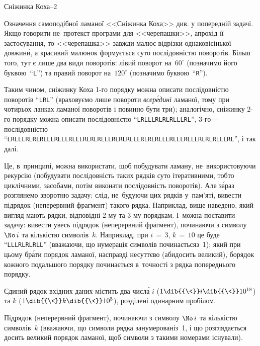 \begin{problemAllDefault}{Сніжинка Коха--2}

Означення самоподібної ламаної <<Сніжинка Коха>> див. у попередній задачі.
Якщо говорити не~про\nolinebreak[2] текст програми для <<черепашки>>, а\nolinebreak[3] про\nolinebreak[2] хід її застосування, то 
<<черепашка>> завжди малює відрізки однаковісінької довжин\'{и}, а красивий малюнок формується суто послідовністю поворотів. Більш того, тут є лише два види поворотів:  
лівий поворот на~$60^\circ$ (позначимо його буквою~``\texttt{L}'') та
правий поворот на~$120^\circ$ (позначимо буквою~``\texttt{R}'').

{%
Таким чином, сніжинку Коха \mbox{1-го} порядку можна описати послідовністю поворотів 
``\texttt{\small{LRL}}'' (враховуємо лише повороти \emph{всер\'{е}дині} ламаної, тому при чотирьох ланках ламаної поворотів і повинно бути три); аналогічно, сніжинку \mbox{2-го} порядку можна описати послідовністю  
``\texttt{\small{LRLLLRLRLRLLLRL}}'', \mbox{3-го}\nolinebreak[3] --- послідовністю 
``\texttt{\small{LRLLLRLRLRLLLRLLLRLLLRLRLRLLLRLRLRLLLRLRLRLLLRLLLRLLLRLRLRLLLRL}}'', і так далі.

}

Це, в~принципі, можна використати, щоб побудувати ламану, не~використовуючи рекурсію (побудувати послідовність таких рядків суто ітеративними, тобто циклічними, засобами, потім виконати послідовність поворотів). Але з\'{а}раз розглянемо зворотню задачу: слід, не~будуючи цих рядків у~пам'яті, вивести підря\-док (неперервний фрагмент) такого рядка. Наприклад, вище наведено, який вигляд мають рядки, відповідні \mbox{2-му} та \mbox{3-му} порядкам. 
І~можна поставити задачу: вивести увесь підря\-док (неперервний фрагмент), починаючи з символу $\No\,i$ та кількістю символів~$k$. Наприклад, при ${i\,{=}\,3}$, ${k\,{=}\,10}$ це буде ``\texttt{\small{LLLRLRLRLL}}'' (вважаючи, що нумерація символів починається\nolinebreak[3] з~1); який при цьому бр\'{а}ти порядок ламаної, насправді несуттєво (аби\nolinebreak[2] досить великий), бо\nolinebreak[2] рядок кожного подальшого поряд\-ку починається в~точності з рядка попереднього \mbox{порядку}.

\InputFile
Єдиний рядок вхідних даних містить два числ\'{а} $i$ ($1\dib{{\<}}i\dib{{\<}}10^{18}$) та $k$ ($1\dib{{\<}}k\dib{{\<}}10^{5}$), розділені одинарним пробілом.

\OutputFile
Підрядок (неперервний фрагмент), починаючи з символу $\No\,i$ та кількістю символів~$k$
(вважаючи, що символи рядка занумеровані\nolinebreak[3] з~1, і що розглядається досить великий порядок ламаної, щоб символи з такими номерами існували).

\end{problemAllDefault}

